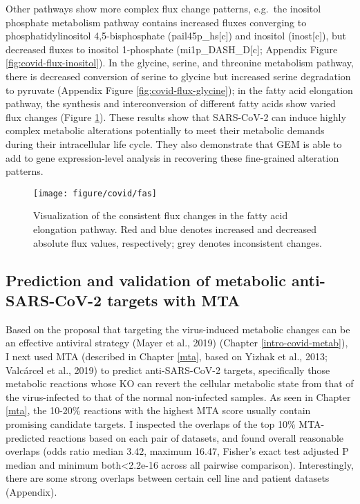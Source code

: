 \documentclass[12pt,twoside,openany,\mydriver]{thesis}  %
\begin{document}
Other pathways show more complex flux change patterns, e.g.~the inositol phosphate metabolism pathway contains increased fluxes converging to phosphatidylinositol 4,5-bisphosphate (pail45p\_hs{[}c{]}) and inositol (inost{[}c{]}), but decreased fluxes to inositol 1-phosphate (mi1p\_DASH\_D{[}c{]}; Appendix Figure \ref{fig:covid-flux-inositol}). In the glycine, serine, and threonine metabolism pathway, there is decreased conversion of serine to glycine but increased serine degradation to pyruvate (Appendix Figure \ref{fig:covid-flux-glycine}); in the fatty acid elongation pathway, the synthesis and interconversion of different fatty acids show varied flux changes (Figure \ref{fig:covid-flux-fas}). These results show that SARS-CoV-2 can induce highly complex metabolic alterations potentially to meet their metabolic demands during their intracellular life cycle. They also demonstrate that GEM is able to add to gene expression-level analysis in recovering these fine-grained alteration patterns.
\begin{figure}
\texttt{[image: figure/covid/fas]} \caption{Visualization of the consistent flux changes in the fatty acid elongation pathway. Red and blue denotes increased and decreased absolute flux values, respectively; grey denotes inconsistent changes.}\label{fig:covid-flux-fas}
\end{figure}
\hypertarget{prediction-and-validation-of-metabolic-anti-sars-cov-2-targets-with-mta}{%
\subsection{Prediction and validation of metabolic anti-SARS-CoV-2 targets with MTA}\label{prediction-and-validation-of-metabolic-anti-sars-cov-2-targets-with-mta}}

Based on the proposal that targeting the virus-induced metabolic changes can be an effective antiviral strategy (Mayer et al., 2019) (Chapter \ref{intro-covid-metab}), I next used MTA (described in Chapter \ref{mta}, based on Yizhak et al., 2013; Valcárcel et al., 2019) to predict anti-SARS-CoV-2 targets, specifically those metabolic reactions whose KO can revert the cellular metabolic state from that of the virus-infected to that of the normal non-infected samples. As seen in Chapter \ref{mta}, the 10-20\% reactions with the highest MTA score usually contain promising candidate targets. I inspected the overlaps of the top 10\% MTA-predicted reactions based on each pair of datasets, and found overall reasonable overlaps (odds ratio median 3.42, maximum 16.47, Fisher's exact test adjusted P median and minimum both\textless{}2.2e-16 across all pairwise comparison). Interestingly, there are some strong overlaps between certain cell line and patient datasets (Appendix).
\end{document}

